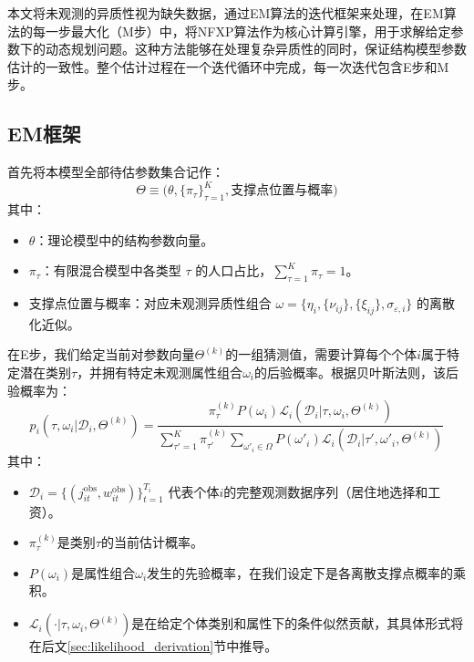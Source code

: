 \documentclass[
  a4paper,
  zihao=-4,
  fontset=mac,
  AutoFakeBold,
  AutoFakeSlant,
  oneside]{ctexbook}
\begin{document}
本文将未观测的异质性视为缺失数据，通过EM算法的迭代框架来处理，在EM算法的每一步最大化（M步）中，将NFXP算法作为核心计算引擎，用于求解给定参数下的动态规划问题。这种方法能够在处理复杂异质性的同时，保证结构模型参数估计的一致性。整个估计过程在一个迭代循环中完成，每一次迭代包含E步和M步。

\subsection{EM框架}

首先将本模型全部待估参数集合记作：
$$
\Theta \equiv \big(\theta, \{\pi_\tau\}_{\tau=1}^K, \text{支撑点位置与概率}\big)
$$
其中：
\begin{itemize}
    \item $\theta$：理论模型中的结构参数向量。
    \item $\pi_\tau$：有限混合模型中各类型 $\tau$ 的人口占比，$\sum_{\tau=1}^K \pi_\tau = 1$。
    \item 支撑点位置与概率：对应未观测异质性组合 $\omega = \{\eta_i, \{\nu_{ij}\}, \{\xi_{ij}\}, \sigma_{\varepsilon,i}\}$ 的离散化近似。
\end{itemize}

在E步，我们给定当前对参数向量$\Theta^{(k)}$的一组猜测值，需要计算每个个体$i$属于特定潜在类别$\tau$，并拥有特定未观测属性组合$\omega_i$的后验概率。根据贝叶斯法则，该后验概率为：
\begin{equation}
    p_{i}(\tau, \omega_i | \mathcal{D}_i, \Theta^{(k)}) = \frac{\pi_\tau^{(k)} P(\omega_i) \mathcal{L}_i(\mathcal{D}_i | \tau, \omega_i, \Theta^{(k)})}{\sum_{\tau'=1}^K \pi_{\tau'}^{(k)} \sum_{\omega'_i \in \Omega} P(\omega'_i) \mathcal{L}_i(\mathcal{D}_i | \tau', \omega'_i, \Theta^{(k)})}
\end{equation}
其中：
\begin{itemize}
    \item $\mathcal{D}_i = \{(j_{it}^{\text{obs}}, w_{it}^{\text{obs}})\}_{t=1}^{T_i}$ 代表个体$i$的完整观测数据序列（居住地选择和工资）。
    \item $\pi_\tau^{(k)}$是类别$\tau$的当前估计概率。
    \item $P(\omega_i)$是属性组合$\omega_i$发生的先验概率，在我们设定下是各离散支撑点概率的乘积。
    \item $\mathcal{L}_i(\cdot | \tau, \omega_i, \Theta^{(k)})$是在给定个体类别和属性下的条件似然贡献，其具体形式将在后文\ref{sec:likelihood_derivation}节中推导。
\end{itemize}
\end{document}
